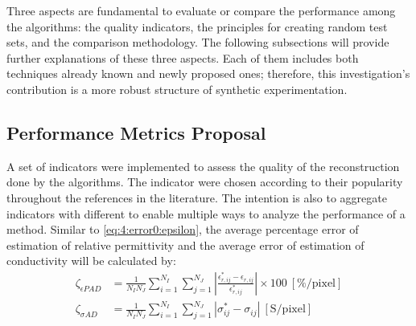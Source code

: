 			Three aspects are fundamental to evaluate or compare the performance among the algorithms: the quality indicators, the principles for creating random test sets, and the comparison methodology. The following subsections will provide further explanations of these three aspects. Each of them includes both techniques already known and newly proposed ones; therefore, this investigation's contribution is a more robust structure of synthetic experimentation.
			
		\subsection{Performance Metrics Proposal}\label{chap:proposed-methodology:library:metrics}
		
			A set of indicators were implemented to assess the quality of the reconstruction done by the algorithms. The indicator were chosen according to their popularity throughout the references in the literature. The intention is also to aggregate indicators with different to enable multiple ways to analyze the performance of a method. Similar to \eqref{eq:4:error0:epsilon}, the average percentage error of estimation of relative permittivity and the average error of estimation of conductivity will be calculated by:
			\begin{align}
				\zeta_{\epsilon PAD} &= \frac{1}{N_IN_J}\sum\limits_{i=1}^{N_I}\sum\limits_{j=1}^{N_J}\left|\frac{\epsilon^*_{r,ij}-\epsilon_{r,ij}}{\epsilon^*_{r,ij}}\right|\times100~[\%/\mathrm{pixel}] \label{eq:4:zeta:epad} \\
				\zeta_{\sigma AD} &= \frac{1}{N_IN_J}\sum\limits_{i=1}^{N_I}\sum\limits_{j=1}^{N_J}\left|\sigma^*_{ij}-\sigma_{ij}\right|~[\mathrm{S}/\mathrm{pixel}] \label{eq:4:zeta:sad}
			\end{align}
			
